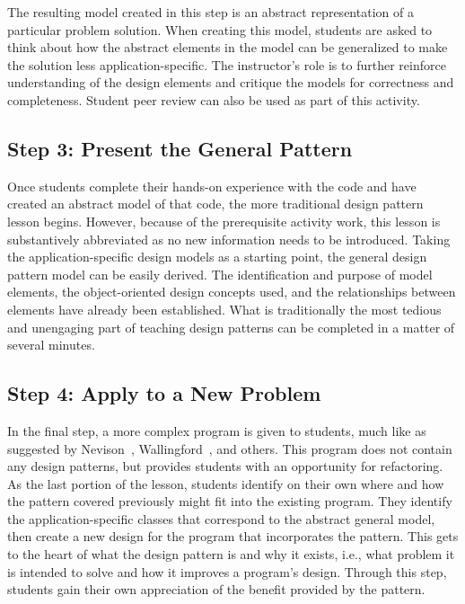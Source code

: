 \documentclass[conference]{IEEEtran}
\begin{document}
The resulting model created in this step is an abstract representation of a particular problem solution. When creating this model, students are asked to think about how the abstract elements in the model can be generalized to make the solution less application-specific. The instructor's role is to further reinforce understanding of the design elements and critique the models for correctness and completeness. Student peer review can also be used as part of this activity.

\subsection{Step 3: Present the General Pattern}

Once students complete their hands-on experience with the code and have created an abstract model of that code, the more traditional design pattern lesson begins. However, because of the prerequisite activity work, this lesson is substantively abbreviated as no new information needs to be introduced. Taking the application-specific design models as a starting point, the general design pattern model can be easily derived. The identification and purpose of model elements, the object-oriented design concepts used, and the relationships between elements have already been established. What is traditionally the most tedious and unengaging part of teaching design patterns can be completed in a matter of several minutes.

\subsection{Step 4: Apply to a New Problem}



In the final step, a more complex program is given to students, much like as suggested by Nevison~\cite{nevison2003}, Wallingford~\cite{wallingford1996}, and others. This program does not contain any design patterns, but provides students with an opportunity for refactoring. As the last portion of the lesson, students identify on their own where and how the pattern covered previously might fit into the existing program. They identify the application-specific classes that correspond to the abstract general model, then create a new design for the program that incorporates the pattern. This gets to the heart of what the design pattern is and why it exists, i.e., what problem it is intended to solve and how it improves a program's design. Through this step, students gain their own appreciation of the benefit provided by the pattern.
\end{document}
